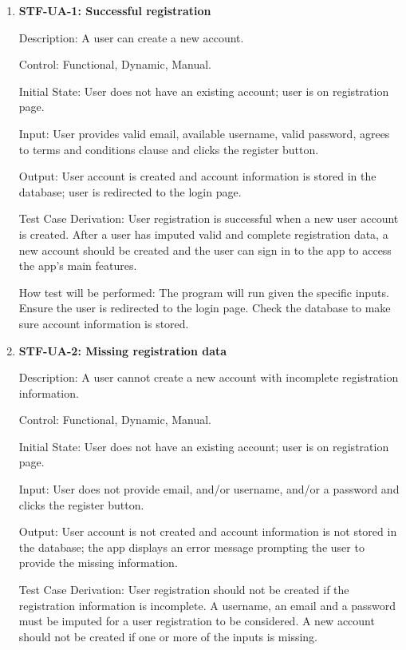 \documentclass[12pt, titlepage]{article}
\begin{document}
\begin{enumerate}

\item{\textbf{STF-UA-1: Successful registration}\\}

Description: A user can create a new account.

Control: Functional, Dynamic, Manual.

Initial State: User does not have an existing account; user is on registration page. 

Input: User provides valid email, available username, valid password, agrees to terms and conditions clause and clicks the register button.

Output: User account is created and account information is stored in the database; user is redirected to the login page.

Test Case Derivation: User registration is successful when a new user account is created. After a user has imputed valid and complete registration data, a new account should be created and the user can sign in to the app to access the app’s main features.

How test will be performed: The program will run given the specific inputs. Ensure the user is redirected to the login page. Check the database to make sure account information is stored.
					
\item{\textbf{STF-UA-2: Missing registration data}\\}

Description: A user cannot create a new account with incomplete registration information.

Control:  Functional, Dynamic, Manual.

Initial State: User does not have an existing account; user is on registration page. 

Input: User does not provide email, and/or username, and/or a password and clicks the register button.

Output: User account is not created and account information is not stored in the database; the app displays an error message prompting the user to provide the missing information.

Test Case Derivation: User registration should not be created if the registration information is incomplete. A username, an email and a password must be imputed for a user registration to be considered. A new account should not be created if one or more of the inputs is missing.


\end{enumerate}
\end{document}
